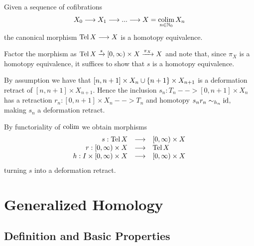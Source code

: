 	\begin{lemma}
		Given a sequence of cofibrations
		\begin{align*}
			X_0 --> X_1 --> ... --> X = \operatorname*{colim} \limits_{n \in \mathbb{N}_0} X_n
		\end{align*}
		the canonical morphism $\operatorname{Tel} X --> X$ is a homotopy equivalence.
	\end{lemma}
	\begin{sketch}
		Factor the morphism as $\operatorname{Tel} X \xrightarrow{s} [0,\infty) \times X \xrightarrow{\pi_X} X$ and note that, since $\pi_X$ is a homotopy equivalence, it suffices to show that $s$ is a homotopy equivalence.

		By assumption we have that $[n,n+1] \times X_n \cup \{n+1\} \times X_{n+1}$ is a deformation retract of $[n,n+1] \times X_{n+1}$. Hence the inclusion $s_n:T_n-->[0,n+1]\times X_n$ has a retraction $r_n:[0,n+1] \times X_n --> T_n$ and homotopy $s_nr_n \sim_{h_n} \operatorname{id}$, making $s_n$ a deformation retract.

		\TODO{Note that $\colim \limits_{n \in \N_0} \;[0,n+1]\times X_n \isom [0,\infty) \times X$.}

		By functoriality of $\operatorname*{colim}$ we obtain morphisms
		\begin{equation*}
			\begin{array}{rcl}
			s:\operatorname{Tel} X &\longrightarrow& [0,\infty) \times X\\
			r:[0,\infty) \times X &\longrightarrow& \operatorname{Tel} X\\
			h:I \times [0,\infty) \times X &\longrightarrow& [0,\infty) \times X
			\end{array}
		\end{equation*}
		turning $s$ into a deformation retract.
	\end{sketch}

	\newpage
	\section{Generalized Homology}
	\subsection{Definition and Basic Properties}

